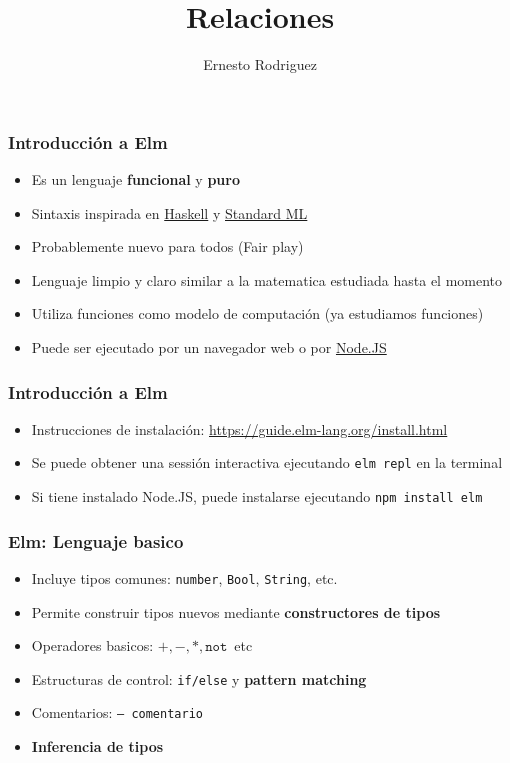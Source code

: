 \documentclass{beamer}
\title[Relaciones]{Relaciones}
\author{Ernesto Rodriguez}
\institute{
    Universidad del Itsmo \\
    \medskip \textit{erodriguez@unis.edu.gt}
}
\date[\today]{}
\begin{document}
\begin{frame}
    \maketitle
\end{frame}

\begin{frame}
\frametitle{Introducci\'on a Elm}
    \begin{itemize}
        \item{Es un lenguaje {\bf funcional} y {\bf puro}}
        \item{Sintaxis inspirada en \href{https://www.haskell.org/}{Haskell} y \href{http://smlnj.org/}{Standard ML}}
        \item{Probablemente nuevo para todos (Fair play)}
        \item{Lenguaje limpio y claro similar a la matematica estudiada hasta el momento}
        \item{Utiliza funciones como modelo de computaci\'on (ya estudiamos funciones)}
        \item{Puede ser ejecutado por un navegador web o por \href{https://nodejs.org/en/}{Node.JS}}
    \end{itemize}
\end{frame}

\begin{frame}
\frametitle{Introducci\'on a Elm}
\begin{itemize}
    \item{Instrucciones de instalaci\'on: \url{https://guide.elm-lang.org/install.html}}
    \item{Se puede obtener una sessi\'on interactiva ejecutando \texttt{elm repl} en la terminal}
    \item{Si tiene instalado Node.JS, puede instalarse ejecutando \texttt{npm install elm}}
\end{itemize}
\end{frame}

\begin{frame}
\frametitle{Elm: Lenguaje basico}
\begin{itemize}
    \item{Incluye tipos comunes: \texttt{number}, \texttt{Bool}, \texttt{String}, etc.}
    \item{Permite construir tipos nuevos mediante {\bf constructores de tipos}}
    \item{Operadores basicos: $+,-,*,\mathtt{not}$\, etc}
    \item{Estructuras de control: \texttt{if/else} y {\bf pattern matching}}
    \item{Comentarios: \texttt{-- comentario}}
    \item{{\bf Inferencia de tipos}}
\end{itemize}
\end{frame}
\end{document}
